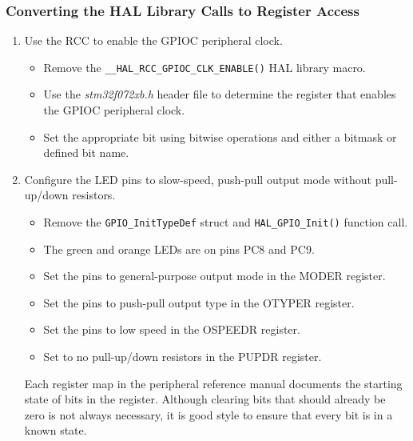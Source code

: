 \documentclass[openany,11pt,fleqn]{book} %
\begin{document}
\subsubsection{Converting the HAL Library Calls to Register Access}
\begin{enumerate}
    
    \item Use the RCC to enable the GPIOC peripheral clock.
    \begin{itemize}
        \item Remove the \texttt{\_\_HAL\_RCC\_GPIOC\_CLK\_ENABLE()} HAL library macro.
        \item Use the \textit{stm32f072xb.h} header file to determine the register that enables the GPIOC peripheral clock.
        \item Set the appropriate bit using bitwise operations and either a bitmask or defined bit name. 
    \end{itemize}
    \item Configure the LED pins to slow-speed, push-pull output mode without pull-up/down resistors.
    \begin{itemize}
        \item Remove the \texttt{GPIO\_InitTypeDef} struct and \texttt{HAL\_GPIO\_Init()} function call.
        \item The green and orange LEDs are on pins PC8 and PC9.
        \item Set the pins to general-purpose output mode in the MODER register. 
        \item Set the pins to push-pull output type in the OTYPER register.
        \item Set the pins to low speed in the OSPEEDR register. 
        \item Set to no pull-up/down resistors in the PUPDR register. 
    \end{itemize}

    Each register map in the peripheral reference manual documents the starting state of bits in the register. Although clearing bits that should already be zero is not always necessary, it is good style to ensure that every bit is in a known state.  
    \medskip


\end{enumerate}
\end{document}
